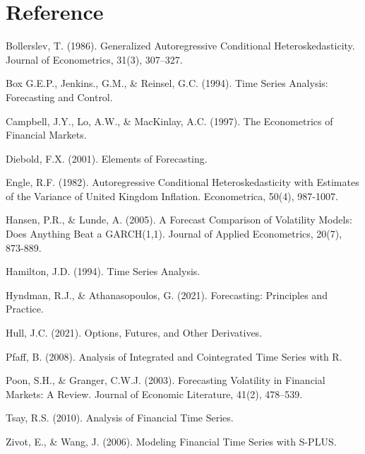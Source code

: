 \documentclass{article}
\newcommand{\1}{\mathbbm{1}}
\theoremstyle{definition}
\begin{document}
\newpage
\section*{Reference}

Bollerslev, T. (1986). Generalized Autoregressive Conditional Heteroskedasticity.
Journal of Econometrics, 31(3), 307–327.

Box G.E.P., Jenkins., G.M., \& Reinsel, G.C. (1994). Time Series Analysis: Forecasting and Control.

Campbell, J.Y., Lo, A.W., \& MacKinlay, A.C. (1997). The Econometrics of Financial Markets.

Diebold, F.X. (2001). Elements of Forecasting.

Engle, R.F. (1982). Autoregressive Conditional Heteroskedasticity with Estimates of the Variance of United Kingdom Inflation. Econometrica, 50(4), 987-1007.

Hansen, P.R., \& Lunde, A. (2005). A Forecast Comparison of Volatility Models: Does Anything Beat a GARCH(1,1). Journal of Applied Econometrics, 20(7), 873-889.

Hamilton, J.D. (1994). Time Series Analysis.

Hyndman, R.J., \& Athanasopoulos, G. (2021). Forecasting: Principles and Practice.

Hull, J.C. (2021). Options, Futures, and Other Derivatives.

Pfaff, B. (2008). Analysis of Integrated and Cointegrated Time Series with R.

Poon, S.H., \& Granger, C.W.J. (2003). Forecasting Volatility in Financial Markets: A Review.
Journal of Economic Literature, 41(2), 478–539.

Tsay, R.S. (2010). Analysis of Financial Time Series.

Zivot, E., \& Wang, J. (2006). Modeling Financial Time Series with S-PLUS.
\end{document}

